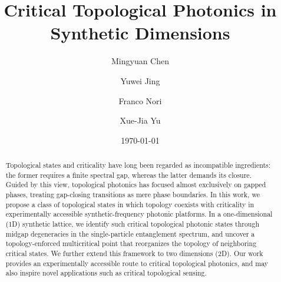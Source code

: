 \documentclass[aps,prl,twocolumn,preprintnumbers,amsmath,amssymb,superscriptaddress,10pt]{revtex4-2}
\begin{document}
\title{Critical Topological Photonics in Synthetic Dimensions}


\author{Mingyuan Chen} 

\author{Yuwei Jing}


\author{Franco Nori}


\author{Xue-Jia Yu}

\date{\today}

\begin{abstract}
Topological states and criticality have long been regarded as incompatible ingredients: the former requires a finite spectral gap, whereas the latter demands its closure. Guided by this view, topological photonics has focused almost exclusively on gapped phases, treating gap-closing transitions as mere phase boundaries. 
In this work, %
we propose a class of topological states in which topology coexists with criticality in experimentally accessible synthetic-frequency photonic platforms. In a one-dimensional (1D) synthetic lattice, we identify such critical topological photonic states through midgap degeneracies in the single-particle entanglement spectrum, and uncover a topology-enforced multicritical point that reorganizes the topology of neighboring critical states. We further extend this framework to two dimensions (2D). 
Our work provides an experimentally accessible route to critical topological photonics, and may also inspire novel applications such as critical topological sensing.
\end{abstract}

\maketitle
\end{document}
